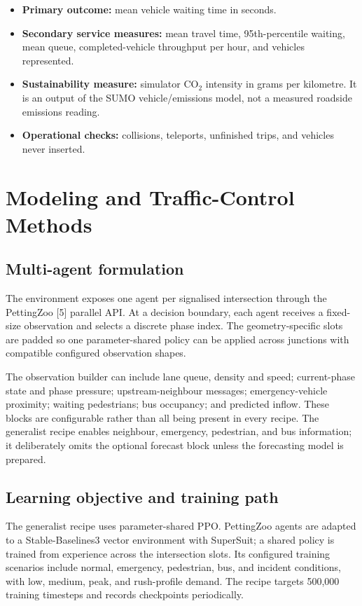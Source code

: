 \documentclass[11pt,a4paper]{article}
\begin{document}
\begin{itemize}
  \item \textbf{Primary outcome:} mean vehicle waiting time in seconds.
  \item \textbf{Secondary service measures:} mean travel time, 95th-percentile waiting,
  mean queue, completed-vehicle throughput per hour, and vehicles represented.
  \item \textbf{Sustainability measure:} simulator CO$_2$ intensity in grams per
  kilometre. It is an output of the SUMO vehicle/emissions model, not a measured
  roadside emissions reading.
  \item \textbf{Operational checks:} collisions, teleports, unfinished trips, and
  vehicles never inserted.
\end{itemize}

\section{Modeling and Traffic-Control Methods}
\label{sec:modeling}
\subsection{Multi-agent formulation}
The environment exposes one agent per signalised intersection through the PettingZoo
[5] parallel API. At a decision boundary, each agent receives a fixed-size observation and
selects a discrete phase index. The geometry-specific slots are padded so one
parameter-shared policy can be applied across junctions with compatible configured
observation shapes.

The observation builder can include lane queue, density and speed; current-phase state
and phase pressure; upstream-neighbour messages; emergency-vehicle proximity; waiting
pedestrians; bus occupancy; and predicted inflow. These blocks are configurable rather
than all being present in every recipe. The generalist recipe enables neighbour,
emergency, pedestrian, and bus information; it deliberately omits the optional forecast
block unless the forecasting model is prepared.

\subsection{Learning objective and training path}
The generalist recipe uses parameter-shared PPO. PettingZoo agents are adapted to a
Stable-Baselines3 vector environment with SuperSuit; a shared policy is trained from
experience across the intersection slots. Its configured training scenarios include
normal, emergency, pedestrian, bus, and incident conditions, with low, medium, peak,
and rush-profile demand. The recipe targets 500,000 training timesteps and records
checkpoints periodically.
\end{document}

